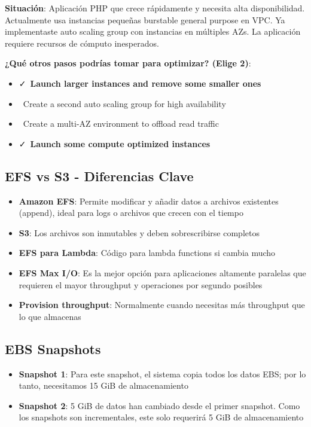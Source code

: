\documentclass[12pt,a4paper]{report}
\newcommand{\vcheckmark}{\textcolor{successgreen}{\faCheck}}
\newcommand{\crossmark}{\textcolor{dangerred}{\faTimes}}
\begin{document}
\begin{warningbox}
\textbf{Situación}: Aplicación PHP que crece rápidamente y necesita alta disponibilidad. Actualmente usa instancias pequeñas burstable general purpose en VPC. Ya implementaste auto scaling group con instancias en múltiples AZs. La aplicación requiere recursos de cómputo inesperados.

\textbf{¿Qué otros pasos podrías tomar para optimizar? (Elige 2)}:
\begin{itemize}
    \item \vcheckmark\ \textbf{Launch larger instances and remove some smaller ones}
    \item \crossmark\ Create a second auto scaling group for high availability
    \item \crossmark\ Create a multi-AZ environment to offload read traffic
    \item \vcheckmark\ \textbf{Launch some compute optimized instances}
\end{itemize}
\end{warningbox}

\subsection{EFS vs S3 - Diferencias Clave}

\begin{itemize}
    \item \textbf{Amazon EFS}: Permite modificar y añadir datos a archivos existentes (append), ideal para logs o archivos que crecen con el tiempo
    \item \textbf{S3}: Los archivos son inmutables y deben sobrescribirse completos
    \item \textbf{EFS para Lambda}: Código para lambda functions si cambia mucho
    \item \textbf{EFS Max I/O}: Es la mejor opción para aplicaciones altamente paralelas que requieren el mayor throughput y operaciones por segundo posibles
    \item \textbf{Provision throughput}: Normalmente cuando necesitas más throughput que lo que almacenas
\end{itemize}

\subsection{EBS Snapshots}

\begin{itemize}
    \item \textbf{Snapshot 1}: Para este snapshot, el sistema copia todos los datos EBS; por lo tanto, necesitamos 15 GiB de almacenamiento
    \item \textbf{Snapshot 2}: 5 GiB de datos han cambiado desde el primer snapshot. Como los snapshots son incrementales, este solo requerirá 5 GiB de almacenamiento
\end{itemize}
\end{document}
